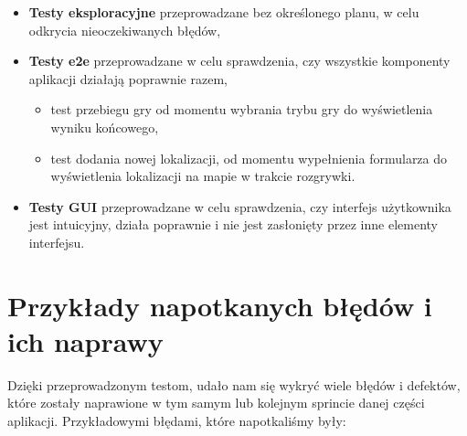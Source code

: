 \begin{itemize}
		\item \textbf{Testy eksploracyjne} przeprowadzane bez określonego planu, w celu odkrycia nieoczekiwanych błędów,

		\item \textbf{Testy e2e} przeprowadzane w celu sprawdzenia, czy wszystkie komponenty aplikacji działają poprawnie razem,
		\begin{itemize}
			\item test przebiegu gry od momentu wybrania trybu gry do wyświetlenia wyniku końcowego,
			\item test dodania nowej lokalizacji, od momentu wypełnienia formularza do wyświetlenia lokalizacji na mapie w trakcie rozgrywki.
		\end{itemize} 

		\item \textbf{Testy GUI} przeprowadzane w celu sprawdzenia, czy interfejs użytkownika jest intuicyjny, działa poprawnie i nie jest zasłonięty przez inne elementy interfejsu.
\end{itemize} 

\section{Przykłady napotkanych błędów i ich naprawy}

Dzięki przeprowadzonym testom, udało nam się wykryć wiele błędów i defektów, które zostały naprawione w tym samym lub kolejnym sprincie danej części aplikacji. Przykładowymi błędami, które napotkaliśmy były:

